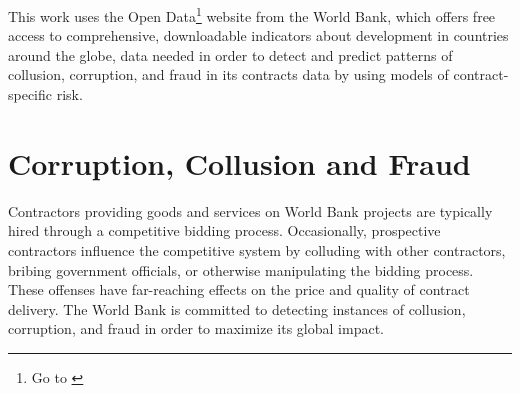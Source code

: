 This work uses the Open Data\footnote{Go to \cite{wb_data}} website from the World Bank, which offers free access to comprehensive, downloadable indicators about development in countries around the globe, data needed in order to detect and predict patterns of collusion, corruption, and fraud in its contracts data by using models of contract-specific risk. 

\section{Corruption, Collusion and Fraud}\label{sec_intro_corruption}

Contractors providing goods and services on World Bank projects are typically hired through a competitive bidding process. Occasionally, prospective contractors influence the competitive system by colluding with other contractors, bribing government officials, or otherwise manipulating the bidding process. These offenses have far-reaching effects on the price and quality of contract delivery. The World Bank is committed to detecting instances of collusion, corruption, and fraud in order to maximize its global impact.












